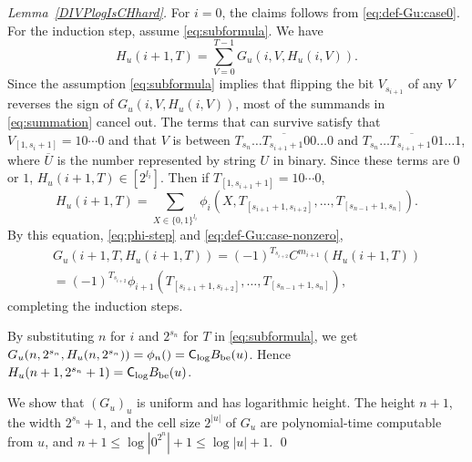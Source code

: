 \begin{proof}[Lemma~\ref{DIVPlogIsCHhard}]
For $i=0$, the claims follows from \eqref{eq:def-Gu:case0}.
For the induction step, assume \eqref{eq:subformula}. 
We have
 \begin{equation} \label{eq:summation}
  H_u(i+1, T) 
  = \sum_{V = 0}^{T-1} G_u(i, V, H_u(i, V)).
 \end{equation}
Since the assumption \eqref{eq:subformula} implies that flipping the bit $V_{s_{i+1}}$ of
any $V$ reverses the sign of $G_u(i, V, H_u(i, V))$,
most of the summands in \eqref{eq:summation} cancel out.
The terms that can survive satisfy that $V_{[1, s_i+1]} = 10 \cdots 0$ and
that $V$ is between $\overline{T_{s_n} \dots T_{s_{i+1}+1} 00 \dots 0}$ and 
$\overline{T_{s_n} \dots T_{s_{i+1}+1} 01 \dots 1}$,
where $\overline U$ is the number represented by string $U$ in binary.
Since these terms are $0$ or $1$, $H_u(i+1, T) \in [2^{l_i}]$.
Then if $T_{[1,s_{i+1}+1]} = 10 \cdots 0$,
 \begin{equation}
  H_u(i+1, T) = \sum_{X \in \{0,1\}^{l_i}}
  \phi_i(X, T_{[s_{i+1}+1, s_{i+2}]}, \dots, T_{[s_{n-1}+1, s_n]}).
 \end{equation}
By this equation, \eqref{eq:phi-step} and \eqref{eq:def-Gu:case-nonzero},
 \begin{multline}
  G_u(i+1,T,H_u(i+1,T)) 
  = (-1)^{T_{s_{i+2}}} C^{m_{i+1}} (H_u(i+1, T))
  \\
  = (-1)^{T_{s_{i+2}}} \phi_{i+1}(T_{[s_{i+1}+1, s_{i+2}]}, \dots, T_{[s_{n-1}+1, s_n]}),
 \end{multline}
completing the induction steps.

By substituting $n$ for $i$ and $2^{s_n}$ for $T$ in \eqref{eq:subformula},
we get $G_u(n, 2^{s_n}, H_u(n,2^{s_n})) = \phi_n() = \mathsf{C}_{\log} B_{\mathrm{be}}(u)$.
Hence $H_u(n+1, 2^{s_n}+1) = \mathsf{C}_{\log} B_{\mathrm{be}}(u)$.
 
We show that $(G_u)_u$ is uniform and has logarithmic height. 
The height $n+1$, the width $2^{s_n}+1$, and the cell size $2^{|u|}$
of $G_u$ are polynomial-time computable from $u$, 
and $n+1 \le \log |0^{2^n}| + 1 \le \log|u| + 1$.
\qed
\end{proof}



